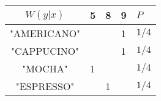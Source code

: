 \begin{tabular}{c|l|l|l||l|}
$W(y|x)$          & 5 & 8 & 9 & $P$\\
\hline
"AMERICANO" &   &  & 1  & $1/4$ \\
\hline
"CAPPUCINO" &   &   & 1  & $1/4$\\
\hline
"MOCHA"     & 1 &   &    & $1/4$\\
\hline
"ESPRESSO"  &   &  1  &   & $1/4$\\
\hline
\end{tabular}
